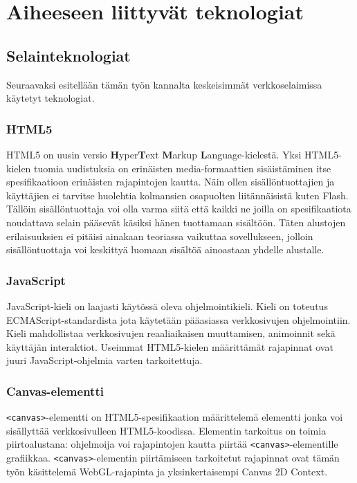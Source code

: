 \section{Aiheeseen liittyvät teknologiat}
\label{sec:taustaa}

\subsection{Selainteknologiat}
Seuraavaksi esitellään tämän työn kannalta keskeisimmät verkkoselaimissa käytetyt teknologiat. 

\subsubsection{HTML5}
HTML5 on uusin versio \textbf{H}yper\textbf{T}ext \textbf{M}arkup \textbf{L}anguage-kielestä. Yksi HTML5-kielen tuomia uudistuksia on erinäisten media-formaattien sisäistäminen itse spesifikaatioon erinäisten rajapintojen kautta\cite{html5diff}. Näin ollen sisällöntuottajien ja käyttäjien ei tarvitse huolehtia kolmansien osapuolten liitännäisistä kuten Flash. Tällöin sisällöntuottaja voi olla varma siitä että kaikki ne joilla on spesifikaatiota noudattava selain pääsevät käsiksi hänen tuottamaan sisältöön. Täten alustojen erilaisuuksien ei pitäisi ainakaan teoriassa vaikuttaa sovellukseen, jolloin sisällöntuottaja voi keskittyä luomaan sisältöä ainoastaan yhdelle alustalle.

\subsubsection{JavaScript}
JavaScript-kieli on laajasti käytössä oleva ohjelmointikieli. Kieli on toteutus ECMAScript-standardista\cite{ecmascript} jota käytetään pääasiassa verkkosivujen ohjelmointiin\cite{mdnjs}. Kieli mahdollistaa verkkosivujen reaaliaikaisen muuttamisen, animoinnit sekä käyttäjän interaktiot. Useimmat HTML5-kielen määrittämät rajapinnat ovat juuri JavaScript-ohjelmia varten tarkoitettuja.

\subsubsection{Canvas-elementti}
\texttt{<canvas>}-elementti on HTML5-spesifikaation määrittelemä elementti jonka voi sisällyttää verkkosivulleen HTML5-koodissa. Elementin tarkoitus on toimia piirtoalustana: ohjelmoija voi rajapintojen kautta piirtää \texttt{<canvas>}-elementille grafiikkaa. \texttt{<canvas>}-elementin piirtämiseen tarkoitetut rajapinnat ovat tämän työn käsittelemä WebGL-rajapinta ja yksinkertaisempi Canvas 2D Context.\cite{canvas_spec}

